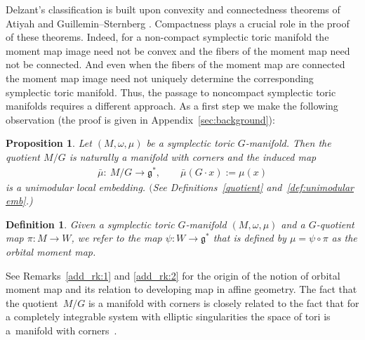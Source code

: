 \documentclass[pdftex]{sigma}
\numberwithin{equation}{section}
\newtheorem{Proposition}[Lemma]{Proposition}
\newtheorem{Definition}[Lemma]{Definition}
\begin{document}
Delzant's classif\/ication is built upon convexity and connectedness
theorems of Atiyah and Guillemin--Sternberg \cite{At,GS:convexity}.
Compactness plays a crucial role in the proof of these theorems.
Indeed, for a non-compact symplectic toric manifold the moment map
image need not be convex and the f\/ibers of the moment map need not be
connected. And even when the f\/ibers of the moment map are connected
the moment map image need not uniquely determine the corresponding
symplectic toric manifold.  Thus, the passage to noncompact symplectic
toric manifolds requires a dif\/ferent approach.  As a f\/irst step we
make the following observation (the proof is given in
Appendix~\ref{sec:background}):

\begin{Proposition} \label{prop:unimod-emb 1}
  Let $(M,\omega, \mu)$ be a symplectic toric $G$-manifold.
  Then the quotient $M/G$ is naturally a manifold with corners
  and the induced map
\begin{gather*} %
  \bar{\mu} \colon \ M/G\to {\mathfrak g}^*, \qquad \bar{\mu}(G\cdot x) := \mu(x)
\end{gather*}
is a unimodular local embedding.
$($See Definitions~{\rm \ref{quotient}} and~{\rm \ref{def:unimodular emb}.)}
\end{Proposition}


\begin{Definition} \label{def:orbital_moment_map}\sloppy
  Given a symplectic toric $G$-manifold $(M,\omega, \mu)$
  and a $G$-quotient map \mbox{$\pi \colon M \to W$},
  we refer to the map $\psi\colon W \to {\mathfrak g}^*$
  that is def\/ined by $\mu = \psi \circ \pi$ as the {\em orbital moment map}.
\end{Definition}

See Remarks~\ref{add_rk:1} and \ref{add_rk:2} for the origin of the notion of
orbital moment map and its relation to  developing map in
af\/f\/ine geometry.  The fact that the quotient~$M/G$ is a manifold with
corners is closely related to the fact that for a completely
integrable system with elliptic singularities the space of tori is a~manifold with corners~\cite{BM,Y}.
\end{document}
